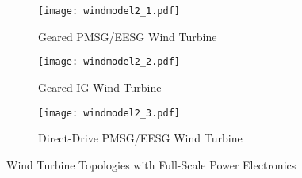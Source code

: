 \begin{figure}[h!]
	\centering
	\begin{subfigure}{0.9\textwidth} %
		\texttt{[image: windmodel2\_1.pdf]}
		\caption{Geared PMSG/EESG Wind Turbine}		
		\label{varspeedpmsg_1}
	\end{subfigure}
	\vspace{0.1em} %
	\begin{subfigure}{0.9\textwidth}
		\texttt{[image: windmodel2\_2.pdf]}
		\caption{Geared IG Wind Turbine}
		\label{varspeedpmsg_2}	
	\end{subfigure}
	\vspace{0.1em} %
	\begin{subfigure}{0.9\textwidth}
	\texttt{[image: windmodel2\_3.pdf]}
	\caption{Direct-Drive PMSG/EESG Wind Turbine}
	\label{varspeedpmsg_3}	
	\end{subfigure}
	\caption{Wind Turbine Topologies with Full-Scale Power Electronics}
\end{figure}
